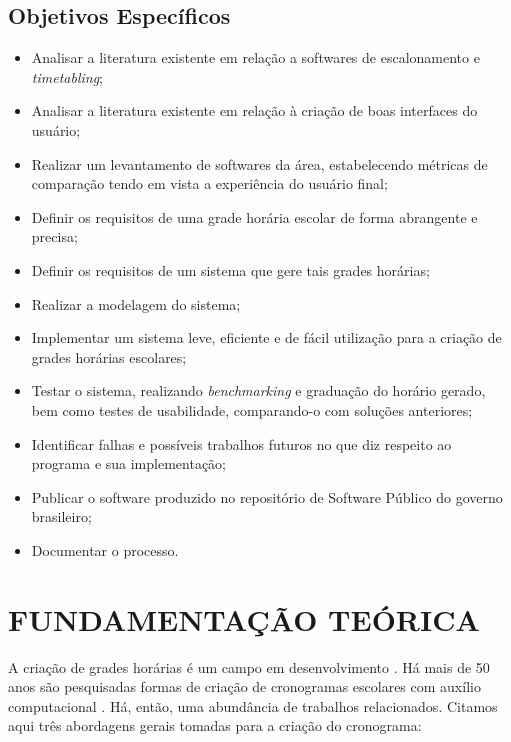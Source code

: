 \documentclass[12pt,a4paper]{article}
\begin{document}
		\subsection{Objetivos Específicos}

			\begin{itemize}
				\item Analisar a literatura existente em relação a softwares de escalonamento e \textit{timetabling};
				\item Analisar a literatura existente em relação à criação de boas interfaces do usuário;
				\item Realizar um levantamento de softwares da área, estabelecendo métricas de comparação tendo em vista a experiência do usuário final;
				\item Definir os requisitos de uma grade horária escolar de forma abrangente e precisa;
				\item Definir os requisitos de um sistema que gere tais grades horárias;
				\item Realizar a modelagem do sistema;
				\item Implementar um sistema leve, eficiente e de fácil utilização para a criação de grades horárias escolares;
				\item Testar o sistema, realizando \textit{benchmarking} e graduação do horário gerado, bem como testes de usabilidade, com\-pa\-ran\-do-o com soluções anteriores;
				\item Identificar falhas e possíveis trabalhos futuros no que diz respeito ao programa e sua implementação;
				\item Publicar o software produzido no repositório de Software Público do governo brasileiro;
				\item Documentar o processo.
			\end{itemize}

	\newpage


	\section{FUNDAMENTAÇÃO TEÓRICA}

		\par A criação de grades horárias é um campo em desenvolvimento \cite{patat2020}. Há mais de 50 anos são pesquisadas formas de criação de cronogramas escolares com auxílio computacional \cite{appleby}. Há, então, uma abundância de trabalhos relacionados. Citamos aqui três abordagens gerais tomadas para a criação do cronograma:
\end{document}
